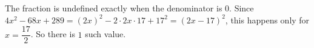 The fraction is undefined exactly when the denominator is $0$. Since $4x^2-68x+289=(2x)^2-2\cdot2x\cdot17+17^2=(2x-17)^2$, this happens only for $x=\dfrac{17}{2}$. So there is $\boxed{1}$ such value.
